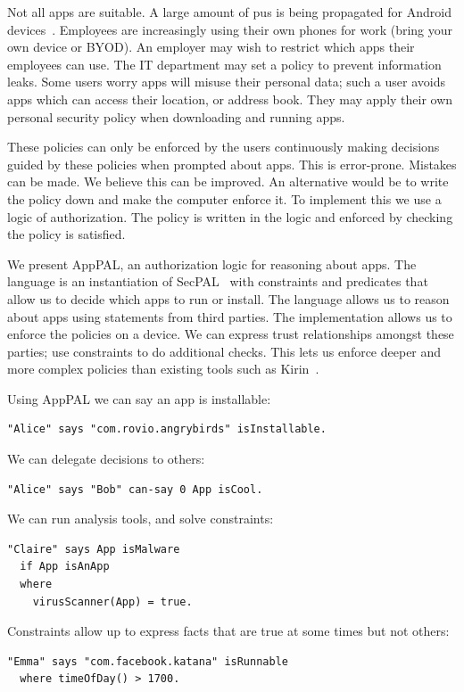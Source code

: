 \documentclass[]{llncs}
\newcommand{\comment}[1]{}%
\begin{document}
Not all apps are suitable.
A large amount of \ac{pus} is being propagated for Android devices~\cite{Truong:2014bi,Svajcer:2013tp}.
Employees are increasingly using their own phones for work (bring your own device or BYOD).
An employer may wish to restrict which apps their employees can use.
The IT department may set a policy to prevent information leaks.
Some users worry apps will misuse their personal data;
  such a user avoids apps which can access their location, or address book.
They may apply their own personal security policy when downloading and running apps.

These policies can only be enforced by the users continuously making decisions guided by these policies when prompted about apps.
This is error-prone.
Mistakes can be made.
We believe this can be improved.
An alternative would be to write the policy down and make the computer enforce it.
To implement this we use a logic of authorization.
The policy is written in the logic and enforced by checking the policy is satisfied.


We present AppPAL, an authorization logic for reasoning about apps.
The language is an instantiation of SecPAL~\cite{Becker:2006vh} with constraints and predicates that allow us to decide which apps to run or install.
The language allows us to reason about apps using statements from third parties.
The implementation allows us to enforce the policies on a device.
We can express trust relationships amongst these parties; use constraints to do additional checks.
This lets us enforce deeper and more complex policies than existing tools such as Kirin~\cite{Enck:2009ko}.

Using AppPAL we can say an app is installable:
\begin{lstlisting}
"Alice" says "com.rovio.angrybirds" isInstallable.
\end{lstlisting}
We can delegate decisions to others:
\begin{lstlisting}
"Alice" says "Bob" can-say 0 App isCool.
\end{lstlisting}
We can run analysis tools, and solve constraints:
\begin{lstlisting}
"Claire" says App isMalware
  if App isAnApp
  where
    virusScanner(App) = true.
\end{lstlisting}
Constraints allow up to express facts that are true at some times but not others:
\begin{lstlisting}
"Emma" says "com.facebook.katana" isRunnable
  where timeOfDay() > 1700.
\end{lstlisting}
\end{document}
